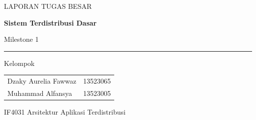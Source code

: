 \begin{titlepage}
\color{black}
\centering
\vspace*{12mm}
{\large LAPORAN TUGAS BESAR}\par
\vspace{5mm}
{\Huge\bfseries Sistem Terdistribusi Dasar}\par
\vspace{5mm}
{\Large Milestone 1}\par
\vspace{10mm}
{\LARGE\bfseries\SystemName}\par
\vspace{4mm}
\rule{0.75\linewidth}{0.5pt}\par
\vspace{12mm}
{\Large Kelompok \textbf{\GroupName}}\par
\vspace{8mm}
\begin{tabular}{ll}
Dzaky Aurelia Fawwaz & 13523065\\[3mm]
Muhammad Alfansya & 13523005
\end{tabular}
\vfill
{\large IF4031 Arsitektur Aplikasi Terdistribusi}\par
\vspace{3mm}
{\ReportDate}\par
\vspace{8mm}
\end{titlepage}
